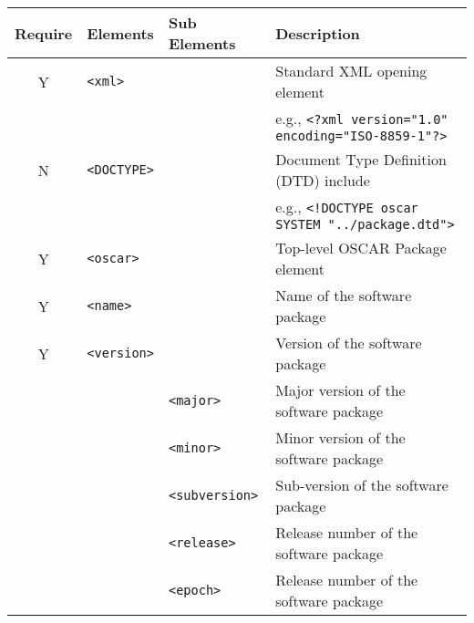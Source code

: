 \begin{table}[h!]
%
%
%
\begin{small}
  \begin{center}
  \begin{tabular}{|c|l|l|l|} 
  \hline
  
  {\bfseries Require} & {\bfseries Elements} 
		& {\bfseries Sub Elements} 
		& {\bfseries Description} 
		\\\hline
		\hline

  Y & \verb|<xml>|
		& 
		& Standard XML opening element
		\\
    & 
		&                 
		&  e.g., {\footnotesize \verb|<?xml version="1.0" encoding="ISO-8859-1"?>|}
		\\\hline

  N & \verb|<DOCTYPE>|
  		&
		& Document Type Definition (DTD) include
		\\
	& 
		&
		& e.g., {\footnotesize \verb|<!DOCTYPE oscar SYSTEM "../package.dtd">|}
		\\\hline

  Y & \verb|<oscar>|   
		&   
		& Top-level OSCAR Package element               
		\\ \hline

  Y & \verb|<name>|    
		&   
		& Name of the software package                  
        \\ \hline

  Y & \verb|<version>|
        & 
        & Version of the software package           
        \\\cline{3-4}
%
    & 
		& \verb|<major>|  
		& Major version of the software package     
		\\\cline{3-4}
%
    & 
		& \verb|<minor>|  
		& Minor version of the software package     
		\\\cline{3-4}
%
    & 
		& \verb|<subversion>| 
		& Sub-version of the software package   
		\\\cline{3-4}
%
	& 
		& \verb|<release>|    
		& Release number of the software package
		\\\cline{3-4}
%
	& 
		& \verb|<epoch>|      
		& Release number of the software package
		\\\hline


\end{tabular}
\end{center}
\end{small}
\end{table}
